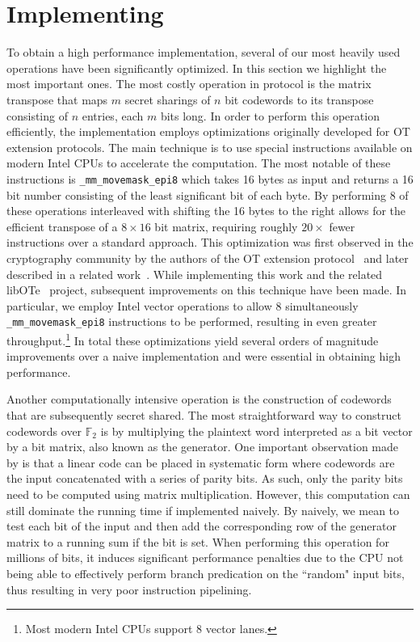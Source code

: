 
\section{Implementing}

To obtain a high performance implementation, several of our most heavily used operations have been significantly optimized. In this section we highlight the most important ones. The most costly operation in \cite{DBLP:conf/tcc/FrederiksenJNT16} protocol is the matrix transpose that maps $m$ secret sharings of $n$ bit codewords to its transpose consisting of $n$ entries, each $m$ bits long. In order to perform this operation efficiently, the implementation employs optimizations originally developed for OT extension protocols. The main technique is to use special instructions available on modern Intel CPUs to accelerate the computation. The most notable of these instructions is \texttt{\_mm\_movemask\_epi8} which takes 16 bytes as input and returns a 16 bit number consisting of the least significant bit of each byte. By performing 8 of these operations interleaved with shifting the 16 bytes to the right allows for the efficient transpose of a $8\times 16$ bit matrix, requiring roughly $20\times$ fewer instructions over a standard approach. This optimization was first observed in the cryptography community by the authors of the OT extension protocol~\cite{DBLP:conf/crypto/KellerOS15} and later described in a related work~\cite{DBLP:conf/ccs/KellerOS16}. While implementing this work and the related libOTe~\cite{libOTe} project, subsequent improvements on this technique have been made. In particular, we employ Intel vector operations to allow 8 simultaneously \texttt{\_mm\_movemask\_epi8} instructions to be performed, resulting in even greater throughput.\footnote{Most modern Intel CPUs support 8 vector lanes.} In total these optimizations yield several orders of magnitude improvements over a naive implementation and were essential in obtaining high performance.


Another computationally intensive operation is the construction of codewords that are subsequently secret shared. The most straightforward way to construct codewords over $\mathbb{F}_2$ is by multiplying the plaintext word interpreted as a bit vector by a bit matrix, also known as the generator. One important observation made by \cite{DBLP:conf/tcc/FrederiksenJNT16} is that a linear code can be placed in systematic form where codewords are the input concatenated with a series of parity bits. As such, only the parity bits need to be computed using matrix multiplication. However, this computation can still dominate the running time if implemented naively. By naively, we mean to test each bit of the input and then add the corresponding row of the generator matrix to a running sum if the bit is set. When performing this operation for  millions of bits, it induces significant performance penalties due to the CPU not being able to effectively perform branch predication on the ``random" input bits, thus resulting in very poor instruction pipelining.


